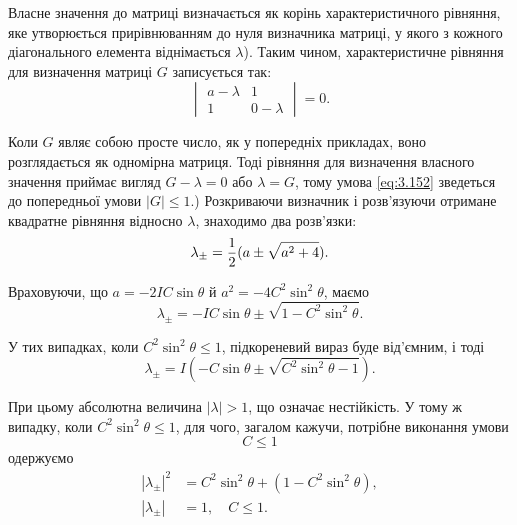 \begin{remark}
    Власне значення до матриці визначається як корінь характеристичного рівняння, яке утворюється прирівнюванням до нуля визначника матриці, у якого з кожного діагонального елемента віднімається $\lambda$). Таким чином, характеристичне рівняння для визначення матриці $G$ записується так:
 	\begin{equation}
 	    \label{eq:3.153}
 	    \begin{vmatrix}
 	        a - \lambda & 1 \\ 1 & 0 - \lambda
 	    \end{vmatrix} = 0.
 	\end{equation}
\end{remark}

Коли $G$ являє собою просте число, як у попередніх прикладах, воно розглядається як одномірна матриця. Тоді рівняння для визначення власного значення приймає вигляд $G - \lambda = 0$ або $\lambda = G$, тому умова \eqref{eq:3.152} зведеться до попередньої умови $|G| \le 1$.) Розкриваючи визначник і розв'язуючи отримане квадратне рівняння відносно $\lambda$, знаходимо два розв'язки:
\begin{equation}
    \label{eq:3.154}
    \lambda_\pm = \frac{1}{2} ( a \pm \sqrt{a^2 + 4} ).
\end{equation}

Враховуючи, що $a = -2 I C \sin \theta$ й $a^2 = -4 C^2 \sin^2 \theta$, маємо
\begin{equation}
    \label{eq:3.155}
    \lambda_\pm = -I C \sin \theta \pm \sqrt{1 - C^2 \sin^2 \theta}.
\end{equation}

У тих випадках, коли $C^2 \sin^2 \theta \le 1$, підкореневий вираз буде від’ємним, і тоді
\begin{equation}
    \label{eq:3.156}
    \lambda_\pm = I \left( -C \sin \theta \pm \sqrt{C^2 \sin^2 \theta - 1} \right).
\end{equation}

При цьому абсолютна величина $|\lambda| > 1$, що означає нестійкість. У тому ж випадку, коли $C^2 \sin^2 \theta \le 1$, для чого, загалом кажучи, потрібне виконання 
умови
\begin{equation}
    \label{eq:3.157}
    C \le 1
\end{equation}
одержуємо
\begin{align}
    \label{eq:3.158}
    |\lambda_\pm|^2 &= C^2 \sin^2 \theta + (1 - C^2 \sin^2 \theta), \\
    \label{eq:3.159}
    |\lambda_\pm| &= 1, \quad C \le 1.
\end{align}

